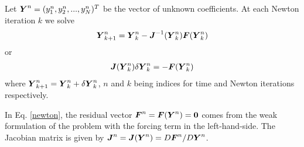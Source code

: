 Let $\boldsymbol{Y}^n = (y_1^n,y_2^n,...,y_N^n)^T$ be the vector of unknown coefficients.  At each Newton iteration $k$ we solve
\begin{align}
  \boldsymbol{Y}_{k+1}^{n} = \boldsymbol{Y}_{k}^{n} 
  - \boldsymbol{J}^{-1}(\boldsymbol{Y}_{k}^{n}) \boldsymbol{F}(\boldsymbol{Y}_{k}^{n})
\end{align}
or
\begin{align}
  \boldsymbol{J}(\boldsymbol{Y}_{k}^{n}) \delta\boldsymbol{Y}_{k}^{n} = - \boldsymbol{F}(\boldsymbol{Y}_{k}^{n}) \label{newton}
\end{align}
where $\boldsymbol{Y}_{k+1}^{n} = \boldsymbol{Y}_{k}^{n} + \delta\boldsymbol{Y}_{k}^{n}$, $n$ and $k$ being indices for time and Newton iterations respectively.

In Eq. \eqref{newton}, the residual vector $\boldsymbol{F}^{n}=\boldsymbol{F}(\boldsymbol{Y}^n)=\boldsymbol{0}$ comes from the weak formulation of the problem with the forcing term in the left-hand-side.  The Jacobian matrix is given by $\boldsymbol{J}^{n}=\boldsymbol{J}(\boldsymbol{Y}^{n})=D\boldsymbol{F}^{n}/D\boldsymbol{Y}^{n}$.
